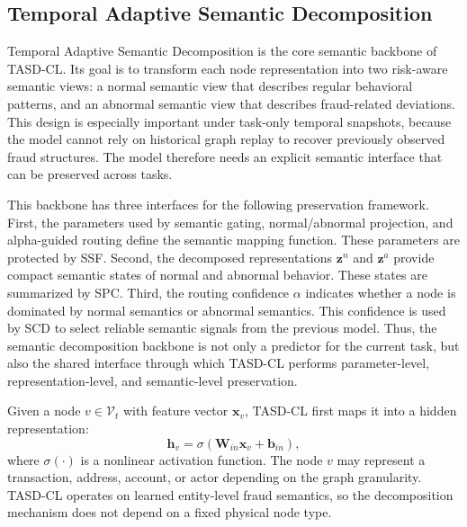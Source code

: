 \subsection{Temporal Adaptive Semantic Decomposition}
\label{subsec:semantic-decomposition}

Temporal Adaptive Semantic Decomposition is the core semantic backbone of TASD-CL. Its goal is to transform each node representation into two risk-aware semantic views: a normal semantic view that describes regular behavioral patterns, and an abnormal semantic view that describes fraud-related deviations. This design is especially important under task-only temporal snapshots, because the model cannot rely on historical graph replay to recover previously observed fraud structures. The model therefore needs an explicit semantic interface that can be preserved across tasks.

This backbone has three interfaces for the following preservation framework. First, the parameters used by semantic gating, normal/abnormal projection, and alpha-guided routing define the semantic mapping function. These parameters are protected by SSF. Second, the decomposed representations $\mathbf{z}^{n}$ and $\mathbf{z}^{a}$ provide compact semantic states of normal and abnormal behavior. These states are summarized by SPC. Third, the routing confidence $\alpha$ indicates whether a node is dominated by normal semantics or abnormal semantics. This confidence is used by SCD to select reliable semantic signals from the previous model. Thus, the semantic decomposition backbone is not only a predictor for the current task, but also the shared interface through which TASD-CL performs parameter-level, representation-level, and semantic-level preservation.

Given a node $v\in\mathcal{V}_t$ with feature vector $\mathbf{x}_v$, TASD-CL first maps it into a hidden representation:
\begin{equation}
    \mathbf{h}_v
    =
    \sigma(\mathbf{W}_{in}\mathbf{x}_v+\mathbf{b}_{in}),
\end{equation}
where $\sigma(\cdot)$ is a nonlinear activation function. The node $v$ may represent a transaction, address, account, or actor depending on the graph granularity. TASD-CL operates on learned entity-level fraud semantics, so the decomposition mechanism does not depend on a fixed physical node type.

